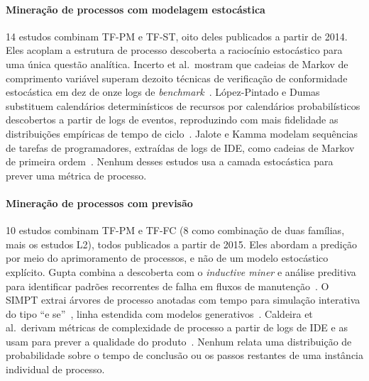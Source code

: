 \documentclass[preprint,12pt,authoryear=false]{elsarticle}
\newcommand{\PM}{TF-PM}
\newcommand{\ST}{TF-ST}
\newcommand{\FC}{TF-FC}
\begin{document}
\paragraph{Mineração de processos com modelagem estocástica}
14 estudos combinam \PM{} e \ST{}, oito deles publicados a partir de 2014. Eles acoplam a estrutura de processo descoberta a raciocínio estocástico para uma única questão analítica. Incerto et al.\ mostram que cadeias de Markov de comprimento variável superam dezoito técnicas de verificação de conformidade estocástica em dez de onze logs de \emph{benchmark}~\cite{incerto2025}. López-Pintado e Dumas substituem calendários determinísticos de recursos por calendários probabilísticos descobertos a partir de logs de eventos, reproduzindo com mais fidelidade as distribuições empíricas de tempo de ciclo~\cite{lopezpintado2023}. Jalote e Kamma modelam sequências de tarefas de programadores, extraídas de logs de IDE, como cadeias de Markov de primeira ordem~\cite{jalote2021}. Nenhum desses estudos usa a camada estocástica para prever uma métrica de processo.

\paragraph{Mineração de processos com previsão}
10 estudos combinam \PM{} e \FC{} (8 como combinação de duas famílias, mais os estudos L2), todos publicados a partir de 2015. Eles abordam a predição por meio do aprimoramento de processos, e não de um modelo estocástico explícito. Gupta combina a descoberta com o \emph{inductive miner} e análise preditiva para identificar padrões recorrentes de falha em fluxos de manutenção~\cite{gupta2017}. O SIMPT extrai árvores de processo anotadas com tempo para simulação interativa do tipo ``e se''~\cite{pourbafrani2021}, linha estendida com modelos generativos~\cite{buliga2025}. Caldeira et al.\ derivam métricas de complexidade de processo a partir de logs de IDE e as usam para prever a qualidade do produto~\cite{caldeira2022}. Nenhum relata uma distribuição de probabilidade sobre o tempo de conclusão ou os passos restantes de uma instância individual de processo.
\end{document}
